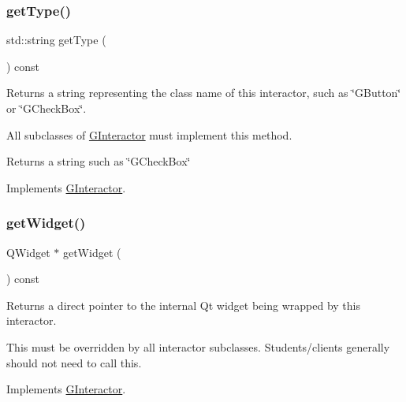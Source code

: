 \subsubsection{\texorpdfstring{get\+Type()}{getType()}}
{\footnotesize\ttfamily std\+::string get\+Type (\begin{DoxyParamCaption}{ }\end{DoxyParamCaption}) const\hspace{0.3cm}{\ttfamily [virtual]}}



Returns a string representing the class name of this interactor, such as \char`\"{}\+G\+Button\char`\"{} or \char`\"{}\+G\+Check\+Box\char`\"{}. 

All subclasses of \mbox{\hyperlink{classGInteractor}{G\+Interactor}} must implement this method. \begin{DoxyReturn}{Returns}
a string such as \char`\"{}\+G\+Check\+Box\char`\"{} 
\end{DoxyReturn}


Implements \mbox{\hyperlink{classGInteractor_a799e073a127b428cc841086d42ea4fed}{G\+Interactor}}.

\mbox{\label{classGButton_a326ee51b5561f807df7b29a1c101f7fd}} 
\subsubsection{\texorpdfstring{get\+Widget()}{getWidget()}}
{\footnotesize\ttfamily Q\+Widget $\ast$ get\+Widget (\begin{DoxyParamCaption}{ }\end{DoxyParamCaption}) const\hspace{0.3cm}{\ttfamily [virtual]}}



Returns a direct pointer to the internal Qt widget being wrapped by this interactor. 

This must be overridden by all interactor subclasses. Students/clients generally should not need to call this. 

Implements \mbox{\hyperlink{classGInteractor}{G\+Interactor}}.

\mbox{\label{classGInteractor_a0ed2965abd4f5701d2cadf71239faf19}} 
